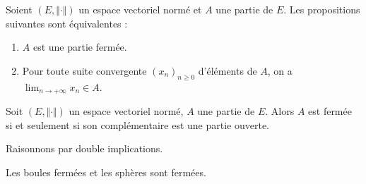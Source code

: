 \documentclass[french,11pt,twoside]{VcCours}
\begin{document}
\begin{Proposition}{} Soient $(E, \Vert \cdot \Vert)$ un espace vectoriel normé et $A$ une partie de $E$. Les propositions suivantes sont équivalentes :
\begin{enumerate}
\item $A$ est une partie fermée.
\item Pour toute suite convergente $(x_n)_{n \geq 0}$ d'éléments de $A$, on a $\lim_{n \rightarrow + \infty} x_n \in A$.
\end{enumerate}
\end{Proposition}


\begin{Proposition}{} Soit $(E, \Vert \cdot \Vert)$ un espace vectoriel normé, $A$ une partie de $E$. Alors $A$ est fermée si et seulement si son complémentaire est une partie ouverte.
\end{Proposition}

\begin{Demonstration}{} Raisonnons par double implications.
%
%
%

\vspace{10cm}
\end{Demonstration}

%
%

\begin{Corollaire}{} Les boules fermées et les sphères sont fermées.
\end{Corollaire}

\begin{Demonstration}{}

\vspace{8cm}

\end{Demonstration}
\end{document}
